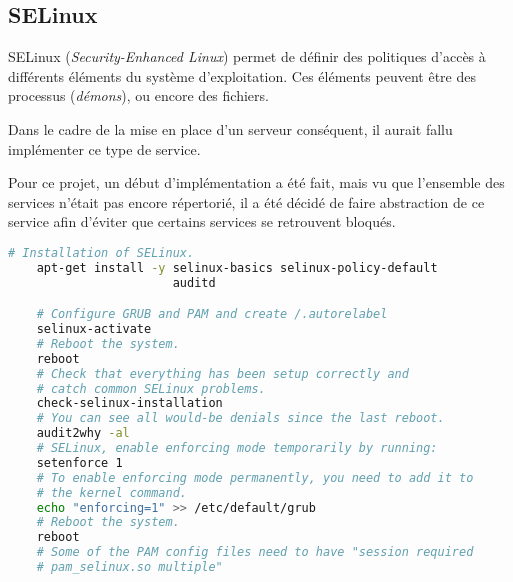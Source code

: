 \subsection{SELinux}
\label{subsec:selinux}

SELinux (\emph{Security-Enhanced Linux}) permet de définir des politiques
d'accès à différents éléments du système d'exploitation. Ces éléments peuvent
être des processus (\emph{démons}), ou encore des fichiers.

Dans le cadre de la mise en place d'un serveur conséquent, il aurait fallu
implémenter ce type de service.

Pour ce projet, un début d'implémentation a été fait, mais vu que l'ensemble des
services n'était pas encore répertorié, il a été décidé de faire abstraction de
ce service afin d'éviter que certains services se retrouvent bloqués.

  \begin{lstlisting}[language=bash]
    # Installation of SELinux.
    apt-get install -y selinux-basics selinux-policy-default
                       auditd

    # Configure GRUB and PAM and create /.autorelabel
    selinux-activate
    # Reboot the system.
    reboot
    # Check that everything has been setup correctly and
    # catch common SELinux problems.
    check-selinux-installation
    # You can see all would-be denials since the last reboot.
    audit2why -al
    # SELinux, enable enforcing mode temporarily by running:
    setenforce 1
    # To enable enforcing mode permanently, you need to add it to
    # the kernel command.
    echo "enforcing=1" >> /etc/default/grub
    # Reboot the system.
    reboot
    # Some of the PAM config files need to have "session required
    # pam_selinux.so multiple"
  \end{lstlisting}

